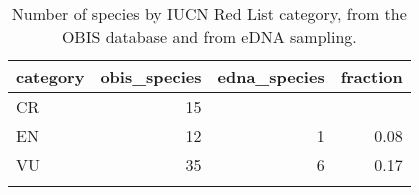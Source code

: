 \begin{longtable}{lrrr}
  \hline
category & obis\_species & edna\_species & fraction \\ 
  \hline
CR &  15 &  &  \\ 
  EN &  12 &   1 & 0.08 \\ 
  VU &  35 &   6 & 0.17 \\ 
   \hline
\hline
\caption{Number of species by IUCN Red List category, from the OBIS database and from eDNA sampling.} 
\label{table:categories}
\end{longtable}
